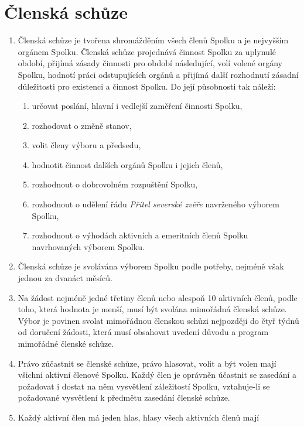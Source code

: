 \documentclass[11pt,a4paper]{article}
\begin{document}
\section{Členská schůze}
\begin{enumerate}[itemsep=0pt]
    \item Členská schůze je tvořena shromážděním všech členů Spolku a je 
    nejvyšším orgánem Spolku. Členská schůze projednává činnost Spolku 
    za uplynulé období, přijímá zásady činnosti pro období následující, 
    volí volené orgány Spolku, hodnotí práci odstupujících orgánů a přijímá 
    další rozhodnutí zásadní důležitosti pro existenci a činnost Spolku. 
    Do její působnosti tak náleží: 
    \begin{enumerate}[itemsep=0pt,topsep=0pt]
        \item určovat poslání, hlavní i vedlejší zaměření činnosti Spolku,
        \item rozhodovat o změně stanov,
        \item volit členy výboru a předsedu,
        \item hodnotit činnost dalších orgánů Spolku i jejich členů,
        \item rozhodnout o dobrovolném rozpuštění Spolku,
        \item rozhodnout o udělení řádu \textit{Přítel severské zvěře} navrženého výborem Spolku,
        \item rozhodnout o výhodách aktivních a emeritních členů Spolku navrhovaných výborem Spolku. 
    \end{enumerate}
    \item Členská schůze je svolávána výborem Spolku podle potřeby, nejméně 
    však jednou za dvanáct měsíců.
    \item Na žádost nejméně jedné třetiny členů nebo alespoň 10 aktivních členů, podle toho, která hodnota je menší, musí být svolána mimořádná 
    členská schůze. Výbor je povinen svolat mimořádnou členskou schůzi 
    nejpozději do čtyř týdnů od doručení žádosti, která musí obsahovat uvedení 
    důvodu a program mimořádné členské schůze.
    \item Právo zúčastnit se členské schůze, právo hlasovat, volit a být volen 
    mají všichni aktivní členové Spolku. Každý člen 
    je oprávněn účastnit se zasedání a požadovat i dostat na něm vysvětlení 
    záležitostí Spolku, vztahuje-li se požadované vysvětlení k předmětu zasedání
    členské schůze.
    \item Každý aktivní člen má jeden hlas, hlasy všech aktivních členů mají 

\end{enumerate}
\end{document}
